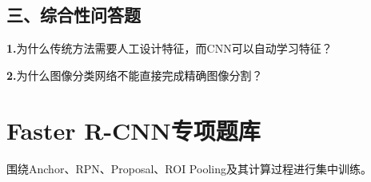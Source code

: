 \documentclass[UTF8,openany,oneside,zihao=-4,fontset=windows]{ctexbook}
\newif\ifshowsolutions
\newcommand{\ChapterIntro}[1]{%
  \begin{tcolorbox}[colback=MVLight,colframe=MVBlue!50,boxrule=0.5pt,arc=1.5mm,left=2mm,right=2mm,top=1.5mm,bottom=1.5mm]
  \small #1
  \end{tcolorbox}
}
\newcommand{\Question}[2]{%
  \par\Needspace{4\baselineskip}\medskip
  \noindent\textbf{\color{MVBlue}#1}\quad #2\par
}
\newenvironment{AnswerBox}{\begin{tcolorbox}[breakable,colback=MVLight,colframe=MVBlue!45,title={参考答案},fonttitle=\bfseries,boxrule=0.55pt,arc=1.5mm,left=2mm,right=2mm,top=1.5mm,bottom=1.5mm]}{\end{tcolorbox}}
\newcommand{\PracticeSpace}[1]{\ifshowsolutions\else\par\vspace{#1}\par\fi}
\begin{document}
\section{三、综合性问答题}
\Question{1.}{为什么传统方法需要人工设计特征，而CNN可以自动学习特征？}
\ifshowsolutions
\begin{AnswerBox}
\par 传统视觉方法通常需要人工设计边缘、纹理、角点、SIFT或HOG等特征，再将特征输入分类器。
\par\noindent\textbf{CNN通过多层卷积从数据中自动学习特征：}
\par\noindent\textbullet\quad 浅层学习边缘和纹理；
\par\noindent\textbullet\quad 中层学习局部形状和部件；
\par 深层学习目标语义。
\par 训练过程中，特征提取器和分类器根据同一损失函数共同优化，实现端到端学习。
\end{AnswerBox}
\else
\PracticeSpace{2.4cm}
\fi
\Question{2.}{为什么图像分类网络不能直接完成精确图像分割？}
\ifshowsolutions
\begin{AnswerBox}
\par 普通分类网络经过多次池化和下采样后，空间分辨率大幅降低，最终通常只输出整幅图像的类别。
\par\noindent\textbf{图像分割需要恢复到原图大小，并对每个像素分类，因此需要：}
\par\noindent\textbullet\quad 保留空间信息；
\par\noindent\textbullet\quad 使用上采样恢复尺寸；
\par\noindent\textbullet\quad 融合浅层定位特征；
\par 输出与输入空间对应的特征图。
\par U-Net正是通过编码器、解码器和跳跃连接实现这一过程。
\end{AnswerBox}
\else
\PracticeSpace{2.4cm}
\fi
\chapter{Faster R-CNN专项题库}
\ChapterIntro{围绕Anchor、RPN、Proposal、ROI Pooling及其计算过程进行集中训练。}
\end{document}
